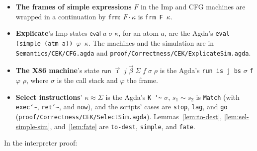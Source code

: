\documentclass[10pt]{article}
\theoremstyle{acmplain}
\newcommand{\key}[1]{\mathsf{#1}}
\newcommand{\evi}[3]{\key{eval}\;#1\;#2\;#3}
\newcommand{\xrun}{\key{run}}
\begin{document}
\begin{itemize}
  body are distinct from each other and from its parameters, so extending
  $\rho$ never shadows. The Agda's frame $\rho \mathbin{{}^{r}{+}\!\!{+}} \tau$ keeps a
  shadowed value in its slot, so it needs no such assumption.
  $\vdash_n$ and $\vdash^{\mathsf{h}}_n$ are \texttt{Kont} and \texttt{KontH},
  and $\approx^n_\varphi$ is \texttt{Fr}.
\item \textbf{The frames of simple expressions} $F$ in the Imp and CFG
  machines are wrapped in a continuation by \texttt{frm}: $F \cdot \kappa$ is
  \texttt{frm F $\kappa$}.
\item \begin{sloppypar}\textbf{Explicate}'s Imp states $\evi{a}{\sigma}{\kappa}$, for an
  atom $a$, are the Agda's \texttt{eval (simple (atm a)) $\varphi$ $\kappa$}.
  The machines and the simulation are in \texttt{Semantics/CEK/CFG.agda} and
  \texttt{proof/Correctness/CEK/ExplicateSim.agda}.\end{sloppypar}
\item \textbf{The X86 machine}'s state $\xrun\;\vec{\imath}\;j\;\vec{\beta}\;\Sigma\;f\;\sigma\;\rho$
  is the Agda's \texttt{run is j bs} $\sigma$ \texttt{f} $\varphi$ $\rho$, where
  $\sigma$ is the call stack and $\varphi$ the frame.
\item \textbf{Select instructions}' $\kappa \approx \Sigma$ is the Agda's
  \texttt{K \char`\~{}} $\sigma$, $s_1 \sim s_2$ is \texttt{Match} (with
  \texttt{exec\char`\~}, \texttt{ret\char`\~}, and \texttt{now}), and the
  scripts' cases are \texttt{stop}, \texttt{lag}, and \texttt{go}
  (\texttt{proof/Correctness/CEK/SelectSim.agda}). Lemmas~\ref{lem:to-dest},
  \ref{lem:sel-simple-sim}, and~\ref{lem:fate} are \texttt{to-dest},
  \texttt{simple}, and \texttt{fate}.
\end{itemize}
In the interpreter proof:
\end{document}
